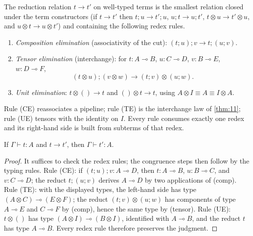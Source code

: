 \begin{definition}\label{def:lambda-op}
The reduction relation $t \longrightarrow t'$ on well-typed terms is the smallest relation closed under the term constructors (if $t \longrightarrow t'$ then $t ; u \longrightarrow t' ; u$, $u ; t \longrightarrow u ; t'$, $t \otimes u \longrightarrow t' \otimes u$, and $u \otimes t \longrightarrow u \otimes t'$) and containing the following redex rules.
\begin{enumerate}
\item[(CE)] \emph{Composition elimination} (associativity of the cut): $(t ; u) ; v \longrightarrow t ; (u ; v)$.
\item[(TE)] \emph{Tensor elimination} (interchange): for $t : A \multimap B$, $u : C \multimap D$, $v : B \multimap E$, $w : D \multimap F$,
\[
(t \otimes u) ; (v \otimes w) \longrightarrow (t ; v) \otimes (u ; w).
\]
\item[(UE)] \emph{Unit elimination}: $t \otimes () \longrightarrow t$ and $() \otimes t \longrightarrow t$, using $A \otimes I \equiv A \equiv I \otimes A$.
\end{enumerate}
Rule (CE) reassociates a pipeline; rule (TE) is the interchange law of \autoref{thm:11}; rule (UE) tensors with the identity on $I$. Every rule consumes exactly one redex and its right-hand side is built from subterms of that redex.
\end{definition}

\begin{lemma}\label{lem:subject-reduction}
If $\Gamma \vdash t : A$ and $t \longrightarrow t'$, then $\Gamma \vdash t' : A$.
\end{lemma}

\begin{proof}
It suffices to check the redex rules; the congruence steps then follow by the typing rules. Rule (CE): if $(t ; u) ; v : A \multimap D$, then $t : A \multimap B$, $u : B \multimap C$, and $v : C \multimap D$; the reduct $t ; (u ; v)$ derives $A \multimap D$ by two applications of (comp). Rule (TE): with the displayed types, the left-hand side has type $(A \otimes C) \multimap (E \otimes F)$; the reduct $(t ; v) \otimes (u ; w)$ has components of type $A \multimap E$ and $C \multimap F$ by (comp), hence the same type by (tensor). Rule (UE): $t \otimes ()$ has type $(A \otimes I) \multimap (B \otimes I)$, identified with $A \multimap B$, and the reduct $t$ has type $A \multimap B$. Every redex rule therefore preserves the judgment.
\end{proof}

